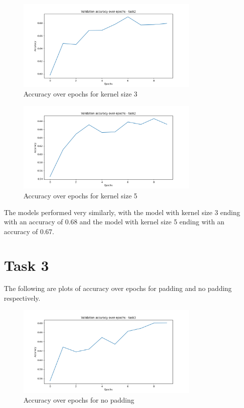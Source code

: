 \documentclass{article}
\begin{document}
\begin{figure}[H]
  \centering
  \includegraphics[width=0.8\textwidth]{accuracy_task2_kernel_size_3.png}
  \caption{Accuracy over epochs for kernel size 3}
\end{figure}

\begin{figure}[H]
  \centering
  \includegraphics[width=0.8\textwidth]{accuracy_task2_kernel_size_5.png}
  \caption{Accuracy over epochs for kernel size 5}
\end{figure}

The models performed very similarly, with the model with kernel size 3 ending with an accuracy of 0.68 and the model with kernel size 5 ending with an accuracy of 0.67.

\newpage

\section{Task 3}

The following are plots of accuracy over epochs for padding and no padding respectively.

\begin{figure}[H]
  \centering
  \includegraphics[width=0.8\textwidth]{accuracy_task3_padding_0.png}
  \caption{Accuracy over epochs for no padding}
\end{figure}
\end{document}
